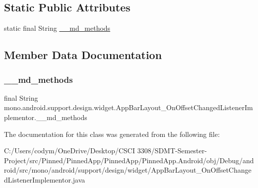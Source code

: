 \subsection*{Static Public Attributes}
\begin{DoxyCompactItemize}
\item 
static final String \hyperlink{classmono_1_1android_1_1support_1_1design_1_1widget_1_1_app_bar_layout___on_offset_changed_listener_implementor_a881f917db1121db046dd9110ea6e5a23}{\+\_\+\+\_\+md\+\_\+methods}
\end{DoxyCompactItemize}


\subsection{Member Data Documentation}
\mbox{\label{classmono_1_1android_1_1support_1_1design_1_1widget_1_1_app_bar_layout___on_offset_changed_listener_implementor_a881f917db1121db046dd9110ea6e5a23}} 
\subsubsection{\texorpdfstring{\+\_\+\+\_\+md\+\_\+methods}{\_\_md\_methods}}
{\footnotesize\ttfamily final String mono.\+android.\+support.\+design.\+widget.\+App\+Bar\+Layout\+\_\+\+On\+Offset\+Changed\+Listener\+Implementor.\+\_\+\+\_\+md\+\_\+methods\hspace{0.3cm}{\ttfamily [static]}}



The documentation for this class was generated from the following file\+:\begin{DoxyCompactItemize}
\item 
C\+:/\+Users/codym/\+One\+Drive/\+Desktop/\+C\+S\+C\+I 3308/\+S\+D\+M\+T-\/\+Semester-\/\+Project/src/\+Pinned/\+Pinned\+App/\+Pinned\+App/\+Pinned\+App.\+Android/obj/\+Debug/android/src/mono/android/support/design/widget/App\+Bar\+Layout\+\_\+\+On\+Offset\+Changed\+Listener\+Implementor.\+java\end{DoxyCompactItemize}
